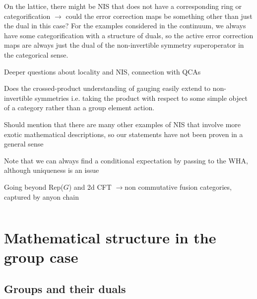 \documentclass{article}
\theoremstyle{definition}
\begin{document}
  On the lattice, there might be NIS that does not have a corresponding ring or categorification
  $\to$ could the error correction maps be something other than just the dual in
  this case? For the examples considered in the continuum, we always have some categorification
  with a structure of duals, so the active error correction maps are always just
  the dual of the non-invertible symmetry superoperator in the categorical sense.

  Deeper questions about locality and NIS, connection with QCAs

  Does the crossed-product understanding of gauging easily extend to non-invertible
  symmetries i.e. taking the product with respect to some simple object of a category
  rather than a group element action.

  Should mention that there are many other examples of NIS that involve more exotic
  mathematical descriptions, so our statements have not been proven in a general
  sense

  Note that we can always find a conditional expectation by passing to the WHA,
  although uniqueness is an issue

Going beyond Rep($G$) and 2d CFT $\to $non commutative fusion categories, captured by anyon chain
  
  \color{black}

  \[
  \]
  \pagebreak
  \appendix

\section{Mathematical structure in the group case}

\subsection{Groups and their duals}
\end{document}
